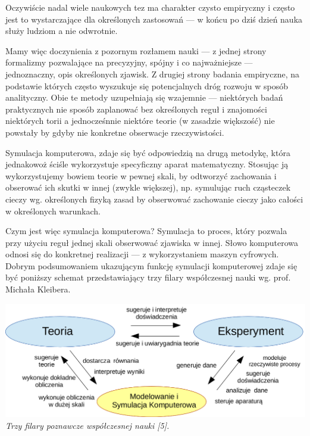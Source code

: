 \par{
Oczywiście nadal wiele naukowych tez ma charakter czysto empiryczny i często jest to wystarczające dla określonych zastosowań --- w końcu po dziś dzień nauka służy ludziom a nie odwrotnie.
}

\par{
Mamy więc doczynienia z pozornym rozłamem nauki --- z jednej strony formalizmy pozwalające na precyzyjny, spójny i co najważniejsze --- jednoznaczny, opis określonych zjawisk. Z drugiej strony badania empiryczne, na podstawie których często wyszukuje się potencjalnych dróg rozwoju w sposób analityczny. Obie te metody uzupełniają się wzajemnie --- niektórych badań praktycznych nie sposób zaplanować bez określonych reguł i znajomości niektórych torii a jednocześnnie niektóre teorie (w zasadzie większość) nie powstały by gdyby nie konkretne obserwacje rzeczywistości.
}

\par{
Symulacja komputerowa, zdaje się być odpowiedzią na drugą metodykę, która jednakowoż ściśle wykorzystuje specyficzny aparat matematyczny. Stosując ją wykorzystujemy bowiem teorie w pewnej skali, by odtworzyć zachowania i obserować ich skutki w innej (zwykle większej), np. symulując ruch cząsteczek cieczy wg. określonych fizyką zasad by obserwować zachowanie cieczy jako całości w określonych warunkach.
}

\par{
Czym jest więc symulacja komputerowa? Symulacja to proces, który pozwala przy użyciu reguł jednej skali obserwować zjawiska w innej. Słowo komputerowa odnosi się do konkretnej realizacji --- z wykorzystaniem maszyn cyfrowych. Dobrym podsumowaniem ukazującym funkcję symulacji komputerowej zdaje się być poniższy schemat przedstawiający trzy filary współczesnej nauki wg. prof. Michała Kleibera.
\begin{center}
\includegraphics[width=\textwidth,keepaspectratio]{img/triada_poznania}
\textit{Trzy filary poznawcze współczesnej nauki [5].}
\end{center}
}

